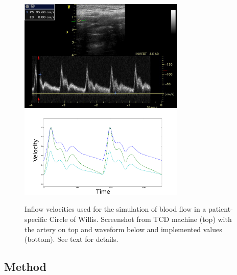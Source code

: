 \begin{figure}
  \begin{center}
      \includegraphics[width=7.9cm]{chapters/kvs-2/pdf/ica.pdf} \\
      \includegraphics[width=7.9cm]{chapters/kvs-2/pdf/cok_inflow.pdf}
  \end{center}
  \caption{Inflow velocities used for the simulation of blood flow in
    a patient-specific Circle of Willis. Screenshot from TCD machine
    (top) with the artery on top and waveform below and implemented
    values (bottom). See text for details.}
  \label{fig:kvs-2:cok_inflow}
\end{figure}

\subsection{Method}

